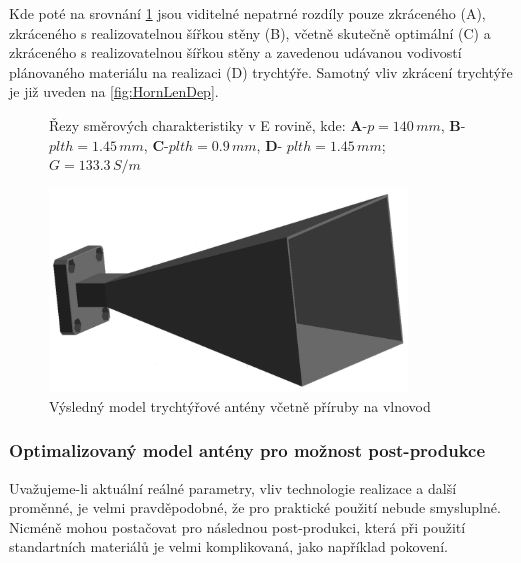 Kde poté na srovnání \ref{fig:hornCompare} jsou viditelné nepatrné rozdíly pouze zkráceného (A), zkráceného s realizovatelnou šířkou stěny (B), včetně skutečně optimální (C) a zkráceného s realizovatelnou šířkou stěny a zavedenou udávanou vodivostí plánovaného materiálu na realizaci (D) trychtýře. Samotný vliv zkrácení trychtýře je již uveden na \ref{fig:HornLenDep}.

\begin{figure}[!htbp]
\caption{Řezy směrových charakteristiky v E rovině, kde: \textbf{A}-$p=140\,mm$, \textbf{B}- $plth=1.45\,mm$, \textbf{C}-$plth=0.9\,mm$, \textbf{D}- $plth=1.45\,mm$; $G=133.3\,S/m$}
\label{fig:hornCompare}
\end{figure}

\begin{figure}[!htbp]
\begin{center}
\includegraphics[width=9.5cm]{pics/HornFinal}
\caption{Výsledný model trychtýřové antény včetně příruby na vlnovod}
\label{fig:HornFinal}
\end{center}
\end{figure}

\subsubsection{Optimalizovaný model antény pro možnost post-produkce}
Uvažujeme-li aktuální reálné parametry, vliv technologie realizace a další proměnné, je velmi pravděpodobné, že pro praktické použití nebude smysluplné. Nicméně mohou postačovat pro následnou post-produkci, která při použití standartních materiálů je velmi komplikovaná, jako například pokovení.

